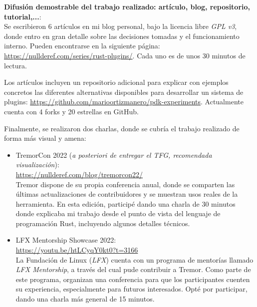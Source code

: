 \documentclass[a4paper,12pt,twoside,hidelinks,openright]{article}
\begin{document}
\textbf{Difusión demostrable del trabajo realizado: artículo, blog, repositorio,
tutorial,...}:\\
Se escribieron 6 artículos en mi blog personal, bajo la licencia libre \emph{GPL
v3}, donde entro en gran detalle sobre las decisiones tomadas y el
funcionamiento interno. Pueden encontrarse en la siguiente página:
\url{https://nullderef.com/series/rust-plugins/}. Cada uno es de unos 30 minutos
de lectura.

Los artículos incluyen un repositorio adicional para explicar con ejemplos
concretos las diferentes alternativas disponibles para desarrollar un sistema de
plugins: \url{https://github.com/marioortizmanero/pdk-experiments}. Actualmente
cuenta con 4 forks y 20 estrellas en GitHub.

Finalmente, se realizaron dos charlas, donde se cubría el trabajo realizado de
forma más visual y amena:

\begin{itemize}
    \item TremorCon 2022 (\emph{a posteriori de entregar el TFG, recomendada
        visualización}):\\
        \url{https://nullderef.com/blog/tremorcon22/}\\
        Tremor dispone de su propia conferencia anual, donde se comparten las
        últimas actualizaciones de contribuidores y se muestran usos reales de
        la herramienta. En esta edición, participé dando una charla de 30
        minutos donde explicaba mi trabajo desde el punto de vista del lenguaje
        de programación Rust, incluyendo algunos detalles técnicos.

    \item LFX Mentorship Showcase 2022:\\
        \url{https://youtu.be/htLCyqY0kt0?t=3166}\\
        La Fundación de Linux (\emph{LFX}) cuenta con un programa de mentorías
        llamado \emph{LFX Mentorship}, a través del cual pude contribuir a
        Tremor. Como parte de este programa, organizan una conferencia para que
        los participantes cuenten su experiencia, especialmente para futuros
        interesados. Opté por participar, dando una charla más general de 15
        minutos.

\end{itemize}
\end{document}
